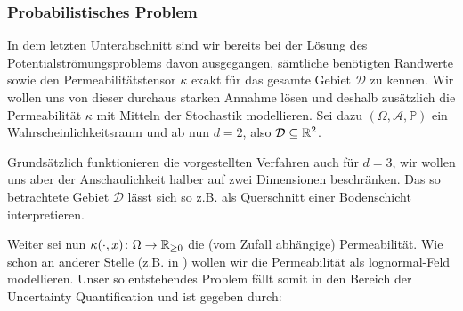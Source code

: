 \subsubsection{Probabilistisches Problem}
\label{Probabilistisches Problem}
In dem letzten Unterabschnitt sind wir bereits bei der Lösung des Potentialströmungsproblems davon ausgegangen, sämtliche benötigten Randwerte sowie den Permeabilitätstensor $\kappa$ exakt für das gesamte Gebiet $\mathcal{D}$ zu kennen.
Wir wollen uns von dieser durchaus starken Annahme lösen und deshalb zusätzlich die Permeabilität $\kappa$ mit Mitteln der Stochastik modellieren.
Sei dazu $(\Omega, \mathcal{A},\mathbb{P})$ ein Wahrscheinlichkeitsraum und ab nun $d=2$, also $\mathcal{D} \subseteq \mathbb{R}^2$.
\begin{Bemerkung}
	Grundsätzlich funktionieren die vorgestellten Verfahren auch für $d=3$, wir wollen uns aber der Anschaulichkeit halber auf zwei Dimensionen beschränken. Das so betrachtete Gebiet $\mathcal{D}$ lässt sich so z.B. als Querschnitt einer Bodenschicht interpretieren.
\end{Bemerkung} 
Weiter sei nun $\kappa (\cdot,x) \colon \Omega \rightarrow \mathbb{R}_{\geq0}$ die (vom Zufall abhängige) Permeabilität.
Wie schon an anderer Stelle (z.B. in \cite{kumar2018multigrid}) wollen wir die Permeabilität als lognormal-Feld modellieren.
Unser so entstehendes Problem fällt somit in den Bereich der Uncertainty Quantification und ist gegeben durch: 


